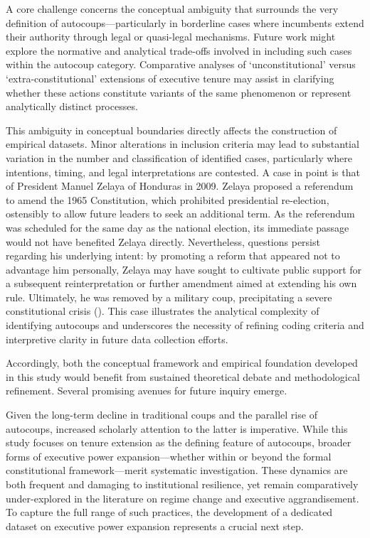 \documentclass[
  12pt,
]{report}
\begin{document}
A core challenge concerns the conceptual ambiguity that surrounds the
very definition of autocoups---particularly in borderline cases where
incumbents extend their authority through legal or quasi-legal
mechanisms. Future work might explore the normative and analytical
trade-offs involved in including such cases within the autocoup
category. Comparative analyses of `unconstitutional' versus
`extra-constitutional' extensions of executive tenure may assist in
clarifying whether these actions constitute variants of the same
phenomenon or represent analytically distinct processes.

This ambiguity in conceptual boundaries directly affects the
construction of empirical datasets. Minor alterations in inclusion
criteria may lead to substantial variation in the number and
classification of identified cases, particularly where intentions,
timing, and legal interpretations are contested. A case in point is that
of President Manuel Zelaya of Honduras in 2009. Zelaya proposed a
referendum to amend the 1965 Constitution, which prohibited presidential
re-election, ostensibly to allow future leaders to seek an additional
term. As the referendum was scheduled for the same day as the national
election, its immediate passage would not have benefited Zelaya
directly. Nevertheless, questions persist regarding his underlying
intent: by promoting a reform that appeared not to advantage him
personally, Zelaya may have sought to cultivate public support for a
subsequent reinterpretation or further amendment aimed at extending his
own rule. Ultimately, he was removed by a military coup, precipitating a
severe constitutional crisis
(). This case illustrates the analytical complexity of identifying
autocoups and underscores the necessity of refining coding criteria and
interpretive clarity in future data collection efforts.

Accordingly, both the conceptual framework and empirical foundation
developed in this study would benefit from sustained theoretical debate
and methodological refinement. Several promising avenues for future
inquiry emerge.

Given the long-term decline in traditional coups and the parallel rise
of autocoups, increased scholarly attention to the latter is imperative.
While this study focuses on tenure extension as the defining feature of
autocoups, broader forms of executive power expansion---whether within
or beyond the formal constitutional framework---merit systematic
investigation. These dynamics are both frequent and damaging to
institutional resilience, yet remain comparatively under-explored in the
literature on regime change and executive aggrandisement. To capture the
full range of such practices, the development of a dedicated dataset on
executive power expansion represents a crucial next step.
\end{document}
